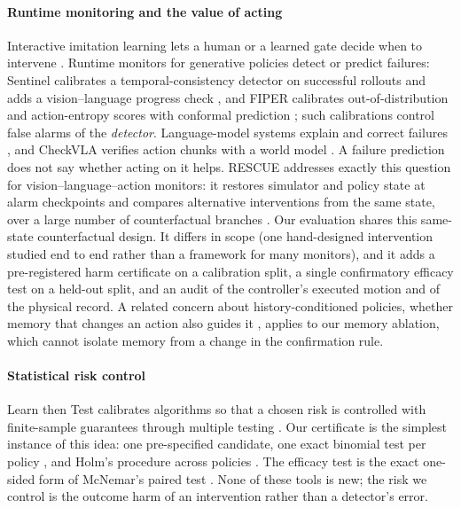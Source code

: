 \paragraph{Runtime monitoring and the value of acting}
Interactive imitation learning lets a human or a learned gate decide when to intervene \cite{kelly2019hgdagger,hoque2022thrifty}. Runtime monitors for generative policies detect or predict failures: Sentinel calibrates a temporal-consistency detector on successful rollouts and adds a vision--language progress check \cite{agia2025unpacking}, and FIPER calibrates out-of-distribution and action-entropy scores with conformal prediction \cite{romer2025fiper}; such calibrations control false alarms of the \emph{detector}. Language-model systems explain and correct failures \cite{liu2023reflect,duan2025aha}, and CheckVLA verifies action chunks with a world model \cite{liu2026checkvla}. A failure prediction does not say whether acting on it helps. RESCUE addresses exactly this question for vision--language--action monitors: it restores simulator and policy state at alarm checkpoints and compares alternative interventions from the same state, over a large number of counterfactual branches \cite{ahmedt2026rescue}. Our evaluation shares this same-state counterfactual design. It differs in scope (one hand-designed intervention studied end to end rather than a framework for many monitors), and it adds a pre-registered harm certificate on a calibration split, a single confirmatory efficacy test on a held-out split, and an audit of the controller's executed motion and of the physical record. A related concern about history-conditioned policies, whether memory that changes an action also guides it \cite{zhang2026memory}, applies to our memory ablation, which cannot isolate memory from a change in the confirmation rule.

\paragraph{Statistical risk control}
Learn then Test calibrates algorithms so that a chosen risk is controlled with finite-sample guarantees through multiple testing \cite{angelopoulos2021ltt}. Our certificate is the simplest instance of this idea: one pre-specified candidate, one exact binomial test per policy \cite{clopper1934}, and Holm's procedure across policies \cite{holm1979}. The efficacy test is the exact one-sided form of McNemar's paired test \cite{mcnemar1947}. None of these tools is new; the risk we control is the outcome harm of an intervention rather than a detector's error.

